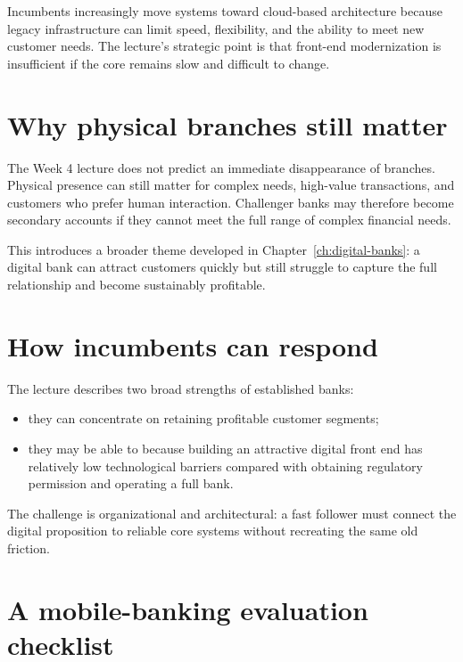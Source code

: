 Incumbents increasingly move systems toward cloud-based architecture because legacy infrastructure can limit speed, flexibility, and the ability to meet new customer needs. The lecture's strategic point is that front-end modernization is insufficient if the core remains slow and difficult to change.

\section{Why physical branches still matter}

The Week 4 lecture does not predict an immediate disappearance of branches. Physical presence can still matter for complex needs, high-value transactions, and customers who prefer human interaction. Challenger banks may therefore become secondary accounts if they cannot meet the full range of complex financial needs.

This introduces a broader theme developed in Chapter~\ref{ch:digital-banks}: a digital bank can attract customers quickly but still struggle to capture the full relationship and become sustainably profitable.

\section{How incumbents can respond}

The lecture describes two broad strengths of established banks:

\begin{itemize}
  \item they can concentrate on retaining profitable customer segments;
  \item they may be able to  because building an attractive digital front end has relatively low technological barriers compared with obtaining regulatory permission and operating a full bank.
\end{itemize}

The challenge is organizational and architectural: a fast follower must connect the digital proposition to reliable core systems without recreating the same old friction.

\section{A mobile-banking evaluation checklist}

